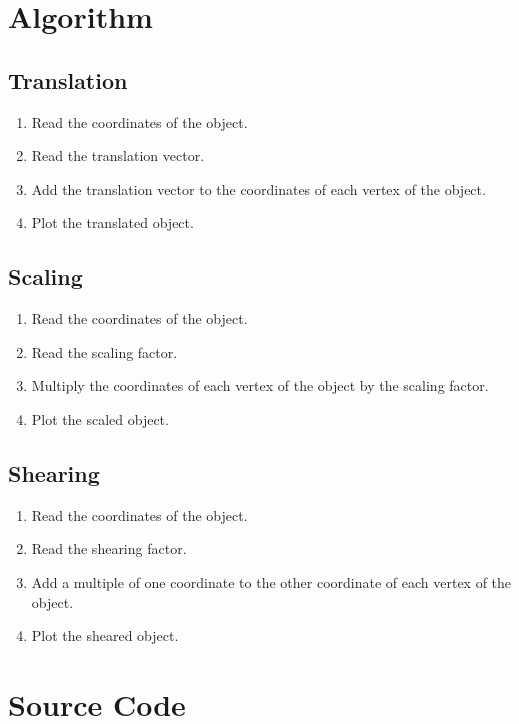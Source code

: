 \documentclass[12pt]{article}
\begin{document}
	\section{Algorithm}
	\subsection{Translation}
	\begin{enumerate}
		\item Read the coordinates of the object.
		\item Read the translation vector.
		\item Add the translation vector to the coordinates of each vertex of the object.
		\item Plot the translated object.
	\end{enumerate}
	\subsection{Scaling}
	\begin{enumerate}
		\item Read the coordinates of the object.
		\item Read the scaling factor.
		\item Multiply the coordinates of each vertex of the object by the scaling factor.
		\item Plot the scaled object.
	\end{enumerate}
	\subsection{Shearing}
	\begin{enumerate}
		\item Read the coordinates of the object.
		\item Read the shearing factor.
		\item Add a multiple of one coordinate to the other coordinate of each vertex of the object.
		\item Plot the sheared object.
	\end{enumerate}

	\section{Source Code}
\end{document}
